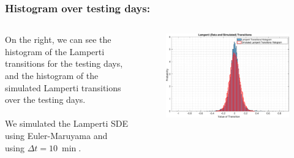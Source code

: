 \documentclass[aspectratio=169]{beamer}\usepackage[utf8]{inputenc}
\begin{document}

\begin{frame}\frametitle{Histogram over testing days:}

\begin{columns}

On the right, we can see the histogram of the Lamperti transitions for the testing days, and the histogram of the simulated Lamperti transitions over the testing days.\\
\quad\\
We simulated the Lamperti SDE using Euler-Maruyama and using $\Delta t=\SI{10}{\min}$.

\begin{figure}[ht!]
\centering
\includegraphics[width=1\textwidth]{../../MATLAB_Files/Results/histograms/lamperti/Optimal_Lamperti.eps}
\end{figure}

\end{columns}

\end{frame}

\end{document}
